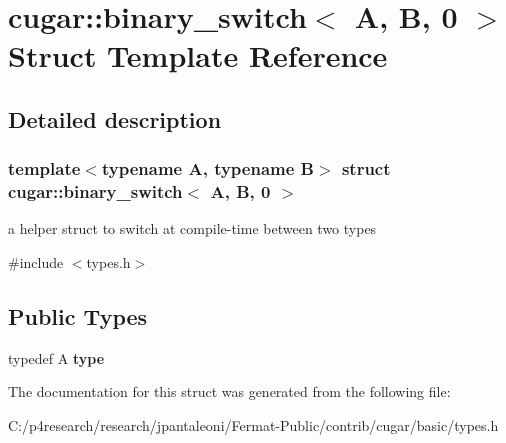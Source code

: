 \hypertarget{structcugar_1_1binary__switch_3_01_a_00_01_b_00_010_01_4}{}\section{cugar\+:\+:binary\+\_\+switch$<$ A, B, 0 $>$ Struct Template Reference}
\label{structcugar_1_1binary__switch_3_01_a_00_01_b_00_010_01_4}


\subsection{Detailed description}
\subsubsection*{template$<$typename A, typename B$>$\newline
struct cugar\+::binary\+\_\+switch$<$ A, B, 0 $>$}

a helper struct to switch at compile-\/time between two types 

{\ttfamily \#include $<$types.\+h$>$}

\subsection*{Public Types}
\begin{DoxyCompactItemize}
\item 
\mbox{\label{structcugar_1_1binary__switch_3_01_a_00_01_b_00_010_01_4_ae86890b6739eeb86c2b151ab0c149678}} 
typedef A {\bfseries type}
\end{DoxyCompactItemize}


The documentation for this struct was generated from the following file\+:\begin{DoxyCompactItemize}
\item 
C\+:/p4research/research/jpantaleoni/\+Fermat-\/\+Public/contrib/cugar/basic/types.\+h\end{DoxyCompactItemize}
